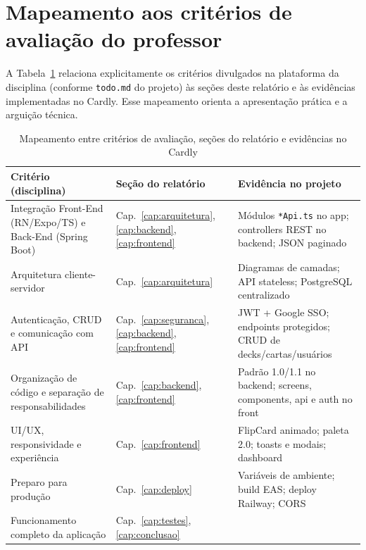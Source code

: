 \section{Mapeamento aos critérios de avaliação do professor}

A Tabela~\ref{tab:criterios-avaliacao} relaciona explicitamente os critérios divulgados na plataforma da disciplina (conforme \texttt{todo.md} do projeto) às seções deste relatório e às evidências implementadas no Cardly. Esse mapeamento orienta a apresentação prática e a arguição técnica.

\begin{table}[htbp]
    \caption{Mapeamento entre critérios de avaliação, seções do relatório e evidências no Cardly}
    \label{tab:criterios-avaliacao}
    \centering
    \small
    \begin{tabular}{p{4.2cm} p{3.8cm} p{6.5cm}}
        \toprule
        \textbf{Critério (disciplina)} & \textbf{Seção do relatório} & \textbf{Evidência no projeto} \\
        \midrule
        Integração Front-End (RN/Expo/TS) e Back-End (Spring Boot) &
        Cap.~\ref{cap:arquitetura}, \ref{cap:backend}, \ref{cap:frontend} &
        Módulos \texttt{*Api.ts} no app; controllers REST no backend; JSON paginado \\
        \addlinespace
        Arquitetura cliente-servidor &
        Cap.~\ref{cap:arquitetura} &
        Diagramas de camadas; API stateless; PostgreSQL centralizado \\
        \addlinespace
        Autenticação, CRUD e comunicação com API &
        Cap.~\ref{cap:seguranca}, \ref{cap:backend}, \ref{cap:frontend} &
        JWT + Google SSO; endpoints protegidos; CRUD de decks/cartas/usuários \\
        \addlinespace
        Organização de código e separação de responsabilidades &
        Cap.~\ref{cap:backend}, \ref{cap:frontend} &
        Padrão 1.0/1.1 no backend; screens, components, api e auth no front \\
        \addlinespace
        UI/UX, responsividade e experiência &
        Cap.~\ref{cap:frontend} &
        FlipCard animado; paleta 2.0; toasts e modais; dashboard \\
        \addlinespace
        Preparo para produção &
        Cap.~\ref{cap:deploy} &
        Variáveis de ambiente; build EAS; deploy Railway; CORS \\
        \addlinespace
        Funcionamento completo da aplicação &
        Cap.~\ref{cap:testes}, \ref{cap:conclusao} &

\end{tabular}
\end{table}
